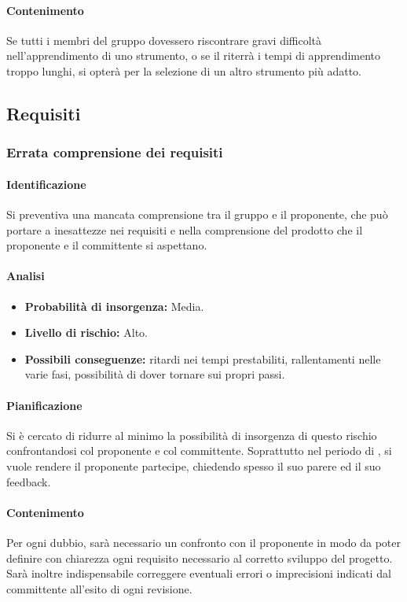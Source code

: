\paragraph {Contenimento}
Se tutti i membri del gruppo dovessero riscontrare gravi difficoltà nell'apprendimento di uno strumento, o se il \RdP{} riterrà i tempi di apprendimento troppo lunghi, si opterà per la selezione di un altro strumento più adatto.

\subsection{Requisiti}
\subsubsection{Errata comprensione dei requisiti}
\paragraph{Identificazione}
Si preventiva una mancata comprensione tra il gruppo e il proponente, che può portare a inesattezze nei requisiti e nella comprensione del prodotto che il proponente e il committente si aspettano.

\paragraph{Analisi}
\begin{itemize}
	\item \textbf{Probabilità di insorgenza:} Media.
	\item \textbf{Livello di rischio:} Alto.
	\item \textbf{Possibili conseguenze:} ritardi nei tempi prestabiliti, rallentamenti nelle varie fasi, possibilità di dover tornare sui propri passi.
\end{itemize}

\paragraph {Pianificazione}
Si è cercato di ridurre al minimo la possibilità di insorgenza di questo rischio confrontandosi col proponente e col committente. Soprattutto nel periodo di \AdR{}, si vuole rendere il proponente partecipe, chiedendo spesso il suo parere ed il suo feedback.

\paragraph {Contenimento}
Per ogni dubbio, sarà necessario un confronto con il proponente in modo da poter definire con chiarezza ogni requisito necessario al corretto sviluppo del progetto. Sarà inoltre indispensabile correggere eventuali errori o imprecisioni indicati dal committente all’esito di ogni revisione.